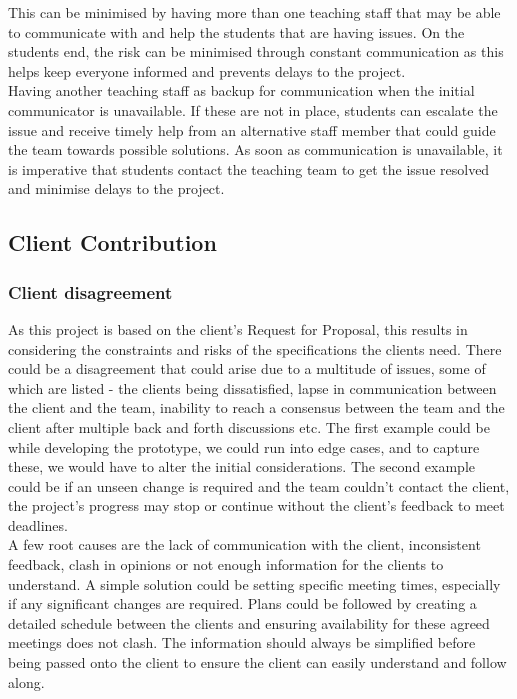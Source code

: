 This can be minimised by having more than one teaching staff that may be able to communicate with and help the students that are having issues. On the students end, the risk can be minimised through constant communication as this helps keep everyone informed and prevents delays to the project.
\\

Having another teaching staff as backup for communication when the initial communicator is unavailable. If these are not in place, students can escalate the issue and receive timely help from an alternative staff member that could guide the team towards possible solutions. As soon as communication is unavailable, it is imperative that students contact the teaching team to get the issue resolved and minimise delays to the project.


\subsection{Client Contribution}
\subsubsection{Client disagreement}
As this project is based on the client's Request for Proposal, this results in considering the constraints and risks of the specifications the clients need. There could be a disagreement that could arise due to a multitude of issues, some of which are listed - the clients being dissatisfied, lapse in communication between the client and the team, inability to reach a consensus between the team and the client after multiple back and forth discussions etc. The first example could be while developing the prototype, we could run into edge cases, and to capture these, we would have to alter the initial considerations. The second example could be if an unseen change is required and the team couldn’t contact the client, the project's progress may stop or continue without the client's feedback to meet deadlines.
\\

A few root causes are the lack of communication with the client, inconsistent feedback, clash in opinions or not enough information for the clients to understand. A simple solution could be setting specific meeting times, especially if any significant changes are required. Plans could be followed by creating a detailed schedule between the clients and ensuring availability for these agreed meetings does not clash. The information should always be simplified before being passed onto the client to ensure the client can easily understand and follow along.
\\


